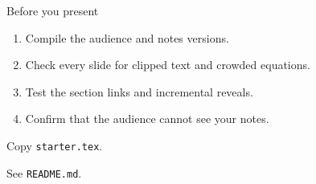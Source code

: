 \documentclass[aspectratio=169,11pt,t,compress]{beamer}
\begin{document}
\begin{frame}{Before you present}
  \begin{enumerate}
    \item Compile the audience and notes versions.
    \item Check every slide for clipped text and crowded equations.
    \item Test the section links and incremental reveals.
    \item Confirm that the audience cannot see your notes.
  \end{enumerate}

  \vspace{.42cm}
  \quad Copy \texttt{starter.tex}.\par
  \vspace{.16cm}
  \quad See \texttt{README.md}.
\end{frame}
\end{document}
